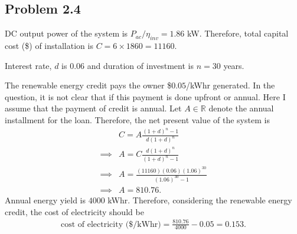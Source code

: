 \subsection*{Problem 2.4}
DC output power of the system is $P_{ac}/\eta_{inv} = 1.86$ kW. Therefore, total capital cost (\$) of installation is $C = 6\times 1860 = 11160$.

Interest rate, $d$ is $0.06$ and duration of investment is $n=30$ years.

The renewable energy credit pays the owner \$$0.05$/kWhr generated. In the question, it is not clear that if this payment is done upfront or annual. Here I assume that the payment of credit is annual. Let $A \in \mathbb{R}$ denote the annual installment for the loan. Therefore, the net present value of the system is
\begin{align*}
	&C = A\frac{(1+d)^n-1}{d(1+d)^n}\\
	\implies & A = C\frac{d(1+d)^n}{(1+d)^n-1}\\
	\implies & A = \frac{(11160)(0.06)(1.06)^{30}}{(1.06)^{30}-1}\\
	\implies & A = 810.76.
\end{align*} 
Annual energy yield is $4000$ kWhr. Therefore, considering the renewable energy credit, the cost of electricity should be
\begin{align*}
	\text{cost of electricity (\$/kWhr)} = \frac{810.76}{4000} - 0.05 = 0.153.
\end{align*}
